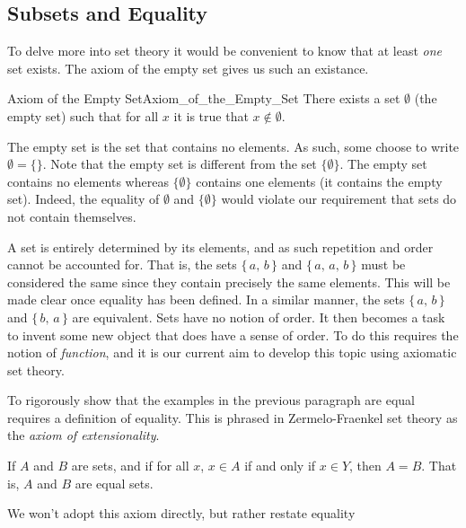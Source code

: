     \subsection{Subsets and Equality}
        To delve more into set theory it would be convenient to know that
        at least \textit{one} set exists. The axiom of the empty set gives
        us such an existance.
        \begin{faxiom}{Axiom of the Empty Set}{Axiom_of_the_Empty_Set}
            There exists a set $\emptyset$ (the empty set) such
            that for all $x$ it is true that $x\notin\emptyset$.
        \end{faxiom}
        The empty set is the set that contains no elements. As such, some
        choose to write $\emptyset=\{\}$. Note that the empty set is
        different from the set $\{\emptyset\}$. The empty set contains no
        elements whereas $\{\emptyset\}$ contains one elements (it
        contains the empty set). Indeed, the equality of $\emptyset$ and
        $\{\emptyset\}$ would violate our requirement that sets do not
        contain themselves.
        \par\hfill\par
        A set is entirely determined by its elements, and as such
        repetition and order cannot be accounted for. That is, the sets
        $\{\,a,\,b\,\}$ and $\{\,a,\,a,\,b\,\}$ must be considered the same
        since they contain precisely the same elements. This will be made clear
        once equality has been defined. In a similar manner, the sets
        $\{\,a,\,b\,\}$ and $\{\,b,\,a\,\}$ are equivalent. Sets have no notion
        of order. It then becomes a task to invent some new object that does
        have a sense of order. To do this requires the notion of
        \textit{function}, and it is our current aim to develop this topic
        using axiomatic set theory.
        \par\hfill\par
        To rigorously show that the examples in the previous paragraph are
        equal requires a definition of equality. This is phrased in
        Zermelo-Fraenkel set theory as the \textit{axiom of extensionality}.
        \begin{axiom}
            If $A$ and $B$ are sets, and if for all $x$, $x\in{A}$
            if and only if $x\in{Y}$, then $A=B$. That is,
            $A$ and $B$ are equal sets.
        \end{axiom}
        We won't adopt this axiom directly, but rather restate equality
